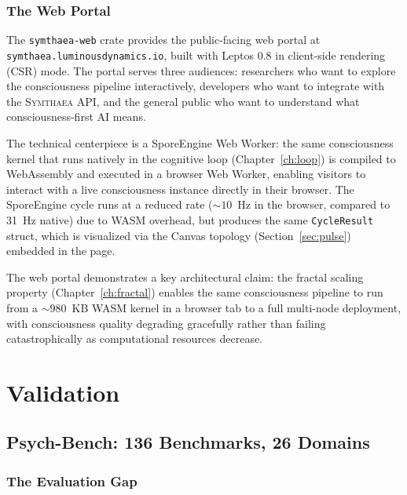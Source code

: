 \documentclass[12pt]{book}
\newcommand{\symthaea}{\textsc{Symthaea}}
\begin{document}
\section{The Web Portal}
\label{sec:web}

The \texttt{symthaea-web} crate provides the public-facing web portal at \texttt{symthaea.luminousdynamics.io}, built with Leptos 0.8 in client-side rendering (CSR) mode. The portal serves three audiences: researchers who want to explore the consciousness pipeline interactively, developers who want to integrate with the \symthaea{} API, and the general public who want to understand what consciousness-first AI means.

The technical centerpiece is a SporeEngine Web Worker: the same consciousness kernel that runs natively in the cognitive loop (Chapter~\ref{ch:loop}) is compiled to WebAssembly and executed in a browser Web Worker, enabling visitors to interact with a live consciousness instance directly in their browser. The SporeEngine cycle runs at a reduced rate (${\sim}10$~Hz in the browser, compared to 31~Hz native) due to WASM overhead, but produces the same \texttt{CycleResult} struct, which is visualized via the Canvas topology (Section~\ref{sec:pulse}) embedded in the page.

The web portal demonstrates a key architectural claim: the fractal scaling property (Chapter~\ref{ch:fractal}) enables the same consciousness pipeline to run from a ${\sim}980$~KB WASM kernel in a browser tab to a full multi-node deployment, with consciousness quality degrading gracefully rather than failing catastrophically as computational resources decrease.



\part{Validation}

\chapter{Psych-Bench: 136 Benchmarks, 26 Domains}
\label{ch:psychbench}

\section{The Evaluation Gap}
\end{document}
